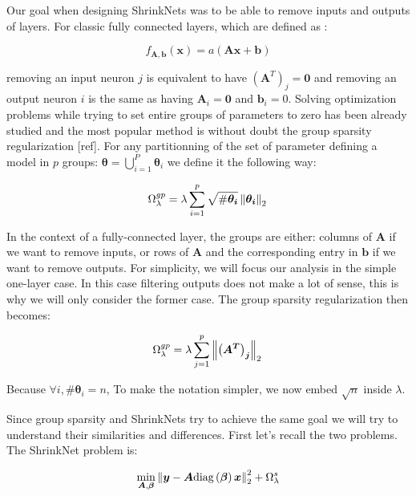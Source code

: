 Our goal when designing ShrinkNets was to be able to remove inputs
and outputs of layers. For classic fully connected layers, which are defined
as :

\begin{equation} \label{fully_connected}
  f_{\bm{A}, \bm{b}}(\bm{x})=a(\bm{Ax + b})
\end{equation}

removing an input neuron $j$ is equivalent to have $\left(\bm{A}^T\right)_j = \bm{0}$
and removing an output neuron $i$ is the same as having $\bm{A}_i = \bm{0}$ and $\bm{b}_i = 0$. Solving  optimization problems while trying to set entire groups
of parameters to zero has been already studied and the most popular method
is without doubt the group sparsity regularization [ref]. For any partitionning of the set of parameter defining a model in $p$ groups: $\bm{\theta} = \bigcup_{i=1}^P \bm{\theta}_i$ we define it the following way:

\begin{equation}
  \Omega_\lambda^{gp} = \lambda \sum_{i=1}^p \sqrt{\#\bm{\theta_i}} \left\lVert\bm{\theta_i}\right\rVert_2 \\
\end{equation}

In the context of a fully-connected layer, the groups are either: columns of $\bm{A}$ if we want to remove inputs, or rows of $\bm{A}$ and the corresponding entry in $\bm{b}$ if we want to remove outputs. For simplicity, we will focus our analysis in the simple one-layer case. In this case filtering outputs does not make a lot of sense, this is why we will only consider the former case. The group sparsity regularization then becomes:


\begin{equation} \label{group_sparsity_regularization}
  \Omega_\lambda^{gp} = \lambda \sum_{j=1}^p \left\lVert\bm{\left(A^T\right)_j}\right\rVert_2 \\
\end{equation}

Because $\forall i, \#\bm{\theta}_i = n$, To make the notation simpler,
we now embed $\sqrt{n}$ inside $\lambda$.

Since group sparsity and ShrinkNets try to achieve the same goal we will try to understand their similarities and differences. First let's recall the two problems. The ShrinkNet problem is:

\begin{equation}
  \min_{\bm{A}, \bm{\beta}} \left\lVert\bm{y} - \bm{A}\text{diag}\left(\bm{\beta}\right)\bm{x}\right\rVert_2^2 + \Omega_\lambda^s
\end{equation}

